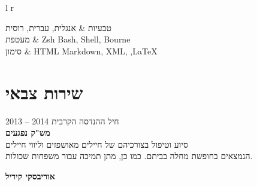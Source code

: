 \documentclass[
	11pt,a4paper %
]{article}
\newcommand{\tableentry}[3]{
	\textsc{#1} & #2\expandafter\ifstrequal\expandafter{#3}{}{\\}{\\[5pt]} %
}
\begin{document}
\begin{hebrew}
\begin{paracol}{2}


	\begin{supertabular}{l r} %
		\tableentry{טבעיות}{אנגלית, עברית, רוסית}{}
		\tableentry{מעטפת}{Zsh Bash, Shell, Bourne}{}
		\tableentry{סימון}{HTML Markdown, XML, ,\LaTeX}{spaceafter}
	\end{supertabular}

	\section{שירות צבאי}

חיל ההנדסה הקרבית \hfill 2014 -- 2013 \\
\textbf{מש"ק נפגעים} \\
סיוע וטיפול בצורכיהם של חיילים מאושפזים וליווי חיילים \\
הנמצאים בחופשת מחלה בביתם. כמו כן, מתן תמיכה עבור משפחות שכולות.

\switchcolumn %

{\Huge{\textbf{אוריבסקי קיריל}}} \\


\end{paracol}
\end{hebrew}
\end{document}
